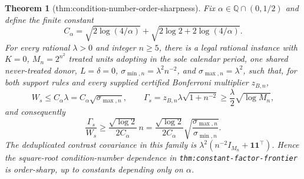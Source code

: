 \documentclass{article}
\newtheorem{theorem}{Theorem}
\begin{document}
\begin{theorem}[thm:condition-number-order-sharpness]\label{thm:condition-number-order-sharpness}
Fix \(\alpha\in\mathbb Q\cap(0,1/2)\) and define the finite constant
\[
 C_\alpha=\sqrt{2\log(4/\alpha)}+
 \sqrt{2\log 2+2\log(4/\alpha)}.
\]
For every rational \(\lambda>0\) and integer \(n\geq5\), there is a legal
rational instance with
\(K=0\), \(M_n=2^{n^2}\) treated units adopting in the sole calendar period,
one shared never-treated donor, \(L=\delta=0\),
\(\sigma_{\min,n}=\lambda^2n^{-2}\), and
\(\sigma_{\max,n}=\lambda^2\), such that, for both
support rules and every supplied certified Bonferroni multiplier \(z_{B,n}\),
\[
 W_s\leq C_\alpha\lambda=C_\alpha\sqrt{\sigma_{\max,n}},
 \qquad
 \Gamma_s=z_{B,n}\lambda\sqrt{1+n^{-2}}
 \geq\frac{\lambda}{2}\sqrt{\log M_n}, \tag{32}
\]
and consequently
\[
 \frac{\Gamma_s}{W_s}
 \geq\frac{\sqrt{\log2}}{2C_\alpha}\,n
 =\frac{\sqrt{\log2}}{2C_\alpha}
 \sqrt{\frac{\sigma_{\max,n}}{\sigma_{\min,n}}}. \tag{33}
\]
The deduplicated contrast covariance in this family is
\(\lambda^2(n^{-2}I_{M_n}+\mathbf1\mathbf1^{\top})\).  Hence the square-root
condition-number dependence in \texttt{thm:constant-factor-frontier} is
order-sharp, up to constants depending only on \(\alpha\).
\end{theorem}
\end{document}
